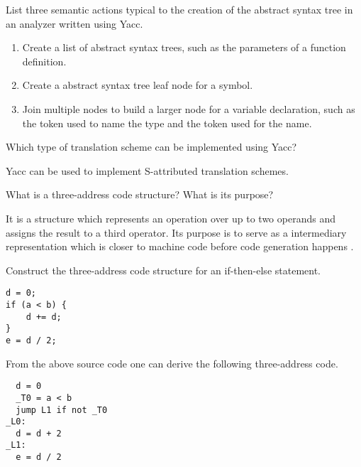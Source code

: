 \begin{Exercise}
List three semantic actions typical to the creation of the abstract syntax tree in an analyzer written using Yacc.
\end{Exercise}
\begin{Answer}
\begin{enumerate}
\item Create a list of abstract syntax trees, such as the parameters of a function definition.
\item Create a abstract syntax tree leaf node for a symbol.
\item Join multiple nodes to build a larger node for a variable declaration, such as the token used to name the type and the token used for the name.
\end{enumerate}
\end{Answer}

\begin{Exercise}
Which type of translation scheme can be implemented using Yacc?
\end{Exercise}
\begin{Answer}
Yacc can be used to implement S-attributed translation schemes.
\end{Answer}

\begin{Exercise}
What is a three-address code structure? What is its purpose?
\end{Exercise}
\begin{Answer}
It is a structure which represents an operation over up to two operands and assigns the result to a third operator.
Its purpose is to serve as a intermediary representation which is closer to machine code before code generation happens \cite[p.~358]{compilers-aho-2007}.
\end{Answer}

\begin{Exercise}
Construct the three-address code structure for an if-then-else statement.
\end{Exercise}
\begin{Answer}
\begin{lstlisting}
d = 0;
if (a < b) {
    d += d;
}
e = d / 2;
\end{lstlisting}
From the above source code one can derive the following three-address code.
\begin{lstlisting}
  d = 0
  _T0 = a < b
  jump L1 if not _T0
_L0:
  d = d + 2
_L1:
  e = d / 2
\end{lstlisting}
\end{Answer}

